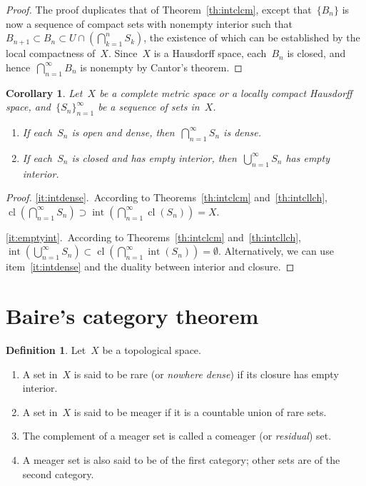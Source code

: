 \documentclass[11pt,a4paper]{article}  %
\newtheorem{corollary}{Corollary}[section]
\theoremstyle{definition}
\newtheorem{definition}{Definition}[section]
\DeclareMathOperator{\inter}{int}
\DeclareMathOperator{\cl}{cl}
\numberwithin{equation}{section}
\begin{document}
\begin{proof}
  The proof duplicates that of Theorem~\ref{th:intclcm}, except that~$\{B_n\}$ is now a sequence of
  compact sets with nonempty interior such that
  $B_{n+1} \subset B_n \subset U \cap (\bigcap_{k=1}^n S_k)$, the existence of which can be
 established by the local compactness of~$X$.  Since~$X$ is a Hausdorff space, each~$B_n$ is closed,
 and hence~$\bigcap_{n=1}^\infty B_n$ is nonempty by Cantor's theorem.
\end{proof}

\begin{corollary}
    \label{coro:intcl}
    Let~$X$ be a complete metric space or a locally compact Hausdorff space,
    and~$\{S_n\}_{n=1}^\infty$ be a sequence of sets in~$X$.
    \begin{enumerate}
        \item\label{it:intdense} If each~$S_n$ is open and dense, then~$\bigcap_{n=1}^\infty S_n$ is dense.
        \item\label{it:emptyint} If each~$S_n$ is closed and has empty interior, then~$\bigcup_{n=1}^\infty S_n$ has empty interior.
    \end{enumerate}
\end{corollary}

\begin{proof}
    \ref{it:intdense}.~According to Theorems~\ref{th:intclcm} and~\ref{th:intcllch},
    $\cl(\bigcap_{n=1}^\infty S_n) \supset \inter( \bigcap_{n=1}^\infty \cl(S_n)) = X$.

    \ref{it:emptyint}.~According to Theorems~\ref{th:intclcm} and~\ref{th:intcllch},
    $\inter(\bigcup_{n=1}^\infty S_n) \subset \cl(\bigcap_{n=1}^\infty \inter(S_n)) = \emptyset$.
    Alternatively, we can use item~\ref{it:intdense} and the duality between interior and closure.
\end{proof}


\section{Baire's category theorem}

\begin{definition}
Let~$X$ be a topological space.
\begin{enumerate}
  \item A set in~$X$ is said to be rare (or \emph{nowhere dense}) if its closure has empty interior.
  \item A set in~$X$ is said to be meager if it is a countable union of rare sets.
  \item The complement of a meager set is called a comeager (or \emph{residual}) set.
  \item A meager set is also said to be of the first category; other sets are
    of the second category.
\end{enumerate}
\end{definition}
\end{document}
